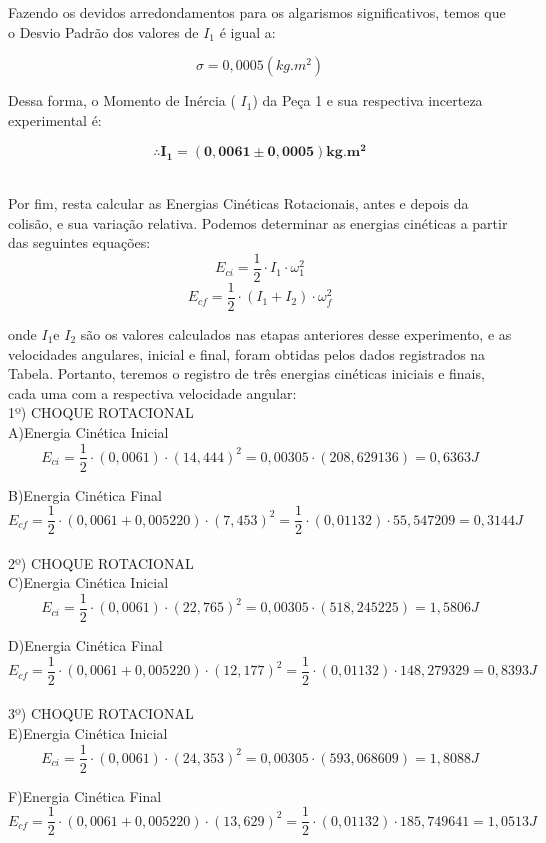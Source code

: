 Fazendo os devidos arredondamentos para os algarismos significativos, temos que o Desvio Padrão  dos valores de $I_1$ é igual a:

\[\sigma = 0,0005 (kg.m^2)\]

Dessa forma, o Momento de Inércia ( $I_1$) da Peça 1 e sua respectiva incerteza experimental é:

\[\therefore \mathbf{I_1 = (0,0061 \pm 0,0005) kg.m^2}\]\

Por fim, resta calcular as Energias Cinéticas Rotacionais, antes e depois da colisão, e sua variação relativa. Podemos determinar as energias cinéticas a partir das seguintes equações:\\

\[E_{ci} = \frac{1}{2} \cdot I_1 \cdot \omega_1^2\]
\[E_{cf} = \frac{1}{2} \cdot (I_1 + I_2) \cdot \omega_f^2\]

onde $I_1$e $I_2$ são os valores calculados nas etapas anteriores desse experimento, e as velocidades angulares, inicial e final, foram obtidas pelos dados registrados na Tabela. Portanto, teremos o registro de três energias cinéticas iniciais e finais, cada uma com a respectiva velocidade angular:\\

1º) CHOQUE ROTACIONAL\\

A)Energia Cinética Inicial
\[E_{ci} = \frac {1}{2}\cdot (0,0061) \cdot (14,444)^2 = 0,00305 \cdot (208,629136) = 0,6363 J\]

B)Energia Cinética Final
\[E_{cf} = \frac {1}{2}\cdot (0,0061+ 0,005220) \cdot (7,453)^2 = \frac {1}{2}\cdot (0,01132) \cdot 55,547209 = 0,3144 J\]\\

2º) CHOQUE ROTACIONAL\\

C)Energia Cinética Inicial
\[E_{ci} = \frac {1}{2}\cdot (0,0061) \cdot (22,765)^2 = 0,00305 \cdot (518,245225) = 1,5806 J\]

D)Energia Cinética Final
\[E_{cf} = \frac {1}{2}\cdot (0,0061+ 0,005220) \cdot (12,177)^2 = \frac {1}{2}\cdot (0,01132) \cdot 148,279329 = 0,8393 J\]\\

3º) CHOQUE ROTACIONAL\\

E)Energia Cinética Inicial
\[E_{ci} = \frac {1}{2}\cdot (0,0061) \cdot (24,353)^2 = 0,00305 \cdot (593,068609) = 1,8088 J\]

F)Energia Cinética Final
\[E_{cf} = \frac {1}{2}\cdot (0,0061+ 0,005220) \cdot (13,629)^2 = \frac {1}{2}\cdot (0,01132) \cdot 185,749641 = 1,0513 J\]\\

